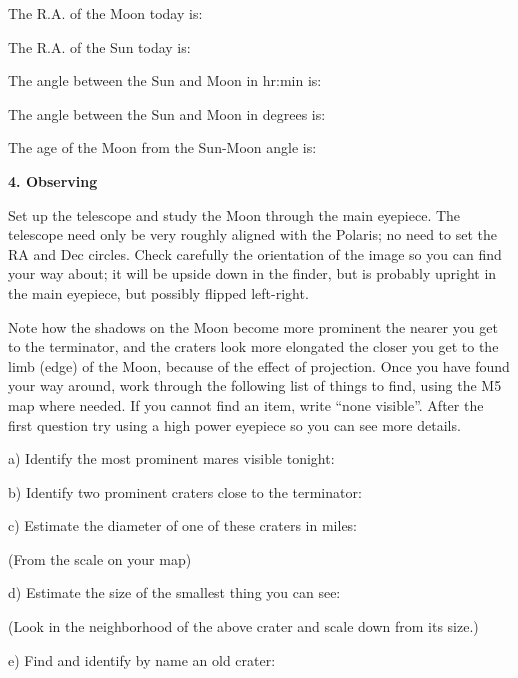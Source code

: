 \medskip
The R.A. of the  Moon today is: \hfill \makebox[2cm]{\hrulefill} 

\medskip
The R.A. of the  Sun today is: \hfill \makebox[2cm]{\hrulefill} 

\medskip
The angle between the Sun and Moon in hr:min is: \hfill \makebox[2cm]{\hrulefill} 

\medskip
The angle between the Sun and Moon in degrees is: \hfill
\makebox[2cm]{\hrulefill} 

\medskip
The age of the Moon from the Sun-Moon angle is: \hfill
\makebox[2cm]{\hrulefill} 
 
\clearpage 

\bigskip
\medskip
\noindent
{\bf 4. Observing}

\medskip\noindent
Set up the telescope and study the Moon through the main eyepiece. The
telescope need only be very roughly aligned with the Polaris; no need
to set the RA and Dec circles. Check carefully the orientation of the
image so you can find your way about; it will be upside down in the
finder, but is probably upright in the main eyepiece, but possibly
flipped left-right.

Note how the shadows on the Moon become more prominent the nearer you
get to the terminator, and the craters look more elongated the closer
you get to the limb (edge) of the Moon, because of the effect of
projection. Once you have found your way around, work through the
following list of things to find, using the M5 map 
where needed.  If you cannot find an item, write
``none visible''. After the first question try using
a high power eyepiece so you can see more details.

\bigskip 

a) Identify the most prominent mares visible tonight: \hfill
\makebox[4cm]{\hrulefill}

\medskip
b) Identify two prominent craters close to the terminator: \hfill
\makebox[4cm]{\hrulefill}

\medskip
c) Estimate the diameter of one of these craters in miles:\hfill
\makebox[4cm]{\hrulefill}

(From the scale on your map)

\medskip
d) Estimate the size of the smallest thing you can see: \hfill
\makebox[4cm]{\hrulefill}

(Look in the neighborhood of the above crater and scale down from its size.)

\medskip
e) Find and identify by name an old crater: \hfill
\makebox[4cm]{\hrulefill}

